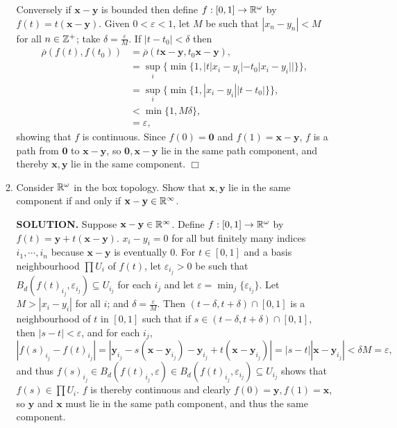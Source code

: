 \documentclass{article}
\begin{document}
\begin{enumerate}
\begin{enumerate}
        Conversely if $\mathbf{x - y}$ is bounded then define $f: [0, 1] \rightarrow \mathbb{R}^\omega$ by $f(t) = t(\mathbf{x-y})$. Given $0 < \varepsilon < 1$, let $M$ be such that $|x_n-y_n| < M$ for all $n \in \mathbb{Z}^+$; take $\delta = \frac{\varepsilon}{M}$. If $|t-t_0|< \delta$ then
        \begin{align*}
            \overline{\rho}(f(t), f(t_0)) &= \overline{\rho}(t\mathbf{x-y}, t_0\mathbf{x-y}), \\
            &= \sup_i \{\min \{1, |t|x_i-y_i| - t_0|x_i-y_i||\}\}, \\
            &= \sup_i \{\min \{1, |x_i-y_i||t - t_0|\}\}, \\
            &< \min \{1, M \delta \}, \\
            &= \varepsilon,
        \end{align*}
        showing that $f$ is continuous. Since $f(0)= \mathbf{0}$ and $f(1) = \mathbf{x-y}$, $f$ is a path from $\mathbf{0}$ to $\mathbf{x-y}$, so $\mathbf{0}, \mathbf{x-y}$ lie in the same path component, and thereby $\mathbf{x}, \mathbf{y}$ lie in the same component. $\Box$

        \item Consider $\mathbb{R}^\omega$ in the box topology. Show that $\mathbf{x}, \mathbf{y}$ lie in the same component if and only if $\mathbf{x-y} \in \mathbb{R}^\infty$.

        {\bf SOLUTION.} Suppose $\mathbf{x-y} \in \mathbb{R}^\infty$. Define $f: [0, 1] \rightarrow \mathbb{R}^\omega$ by $f(t) = \mathbf{y}+t(\mathbf{x-y})$. $x_i-y_i = 0$ for all but finitely many indices $i_1, \cdots, i_n$ because $\mathbf{x-y}$ is eventually $0$. For $t \in [0, 1]$ and a basis neighbourhood $\prod U_i$ of $f(t)$, let $\varepsilon_{i_j} > 0$ be such that $B_d(f(t)_{i_j}, \varepsilon_{i_j}) \subseteq U_{i_j}$ for each $i_j$ and let $\varepsilon = \min_j \{\varepsilon_{i_j}\}$. Let $M > |x_i-y_i|$ for all $i$; and $\delta = \frac{\varepsilon}{M}$. Then $(t-\delta, t+\delta) \cap [0, 1]$ is a neighbourhood of $t$ in $[0, 1]$ such that if $s \in (t-\delta, t+\delta) \cap [0, 1]$, then $|s-t| < \varepsilon$, and for each $i_j$,
        $$|f(s)_{i_j} - f(t)_{i_j}| = |\mathbf{y}_{i_j} - s(\mathbf{x-y}_{i_j}) - \mathbf{y}_{i_j}+t(\mathbf{x-y}_{i_j})| = |s-t||\mathbf{x-y}_{i_j}| < \delta M = \varepsilon,$$
        and thus $f(s)_{i_j} \in B_d(f(t)_{i_j}, \varepsilon) \in B_d(f(t)_{i_j}, \varepsilon_{i_j}) \subseteq U_{i_j}$ shows that $f(s) \in \prod U_i$. $f$ is thereby continuous and clearly $f(0) = \mathbf{y}, f(1) = \mathbf{x}$, so $\mathbf{y}$ and $\mathbf{x}$ must lie in the same path component, and thus the same component.


\end{enumerate}
\end{enumerate}
\end{document}
